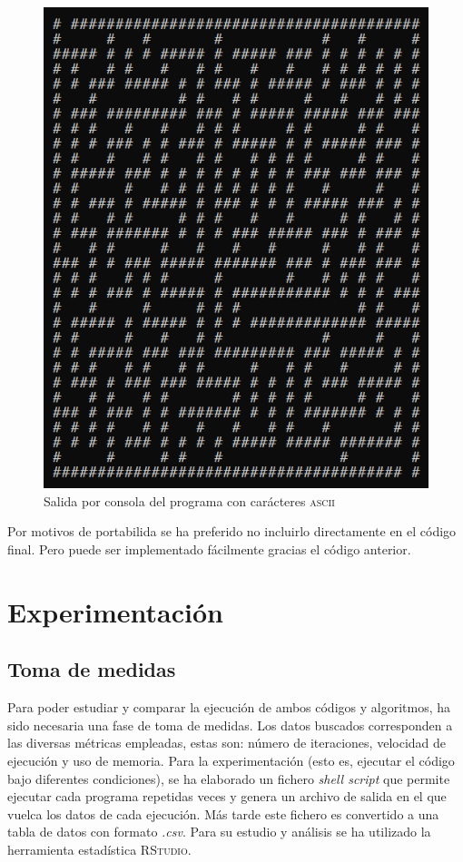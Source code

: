 \documentclass[12pt,a4paper]{article}
\begin{document}
\begin{figure}
	\centering
	\includegraphics[scale=0.6]{fotos/ascii.png}
	\caption{Salida por consola del programa con carácteres \textsc{ascii}}
	\label{ascii}
\end{figure}

Por motivos de portabilida se ha preferido no incluirlo directamente en el código final. Pero puede ser implementado fácilmente gracias el código anterior.

\section{Experimentación}
\subsection{Toma de medidas}
Para poder estudiar y comparar la ejecución de ambos códigos y algoritmos, ha sido necesaria una fase de toma de medidas. Los datos buscados corresponden a las diversas métricas empleadas, estas son: número de iteraciones, velocidad de ejecución y uso de memoria. Para la experimentación (esto es, ejecutar el código bajo diferentes condiciones), se ha elaborado un fichero \textit{shell script} que permite ejecutar cada programa repetidas veces y genera un archivo de salida en el que vuelca los datos de cada ejecución. Más tarde este fichero es convertido a una tabla de datos con formato \textit{.csv}. Para su estudio y análisis se ha utilizado la herramienta estadística \textsc{RStudio}.
\end{document}
